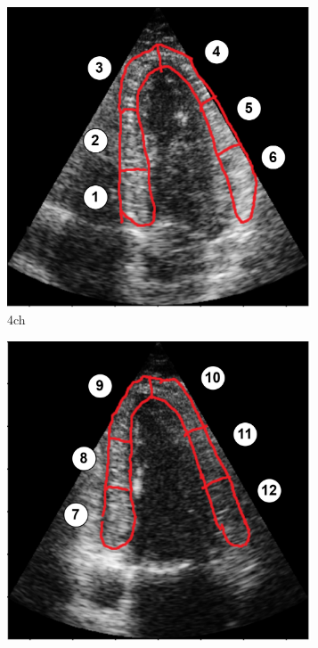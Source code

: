 \begin{figure}[H]
    \centering
    \begin{subfigure}[b]{0.3\textwidth} 
        \includegraphics[width=0.99\textwidth]{echocardiography/4ch_frame_segmented.png}
        \caption{\acrshort{4ch}}
        \label{fig:18_segment_model_4ch}
    \end{subfigure}
    \begin{subfigure}[b]{0.3\textwidth}
        \includegraphics[width=0.99\textwidth]{echocardiography/2ch_frame_segmented.png}

\end{subfigure}
\end{figure}
